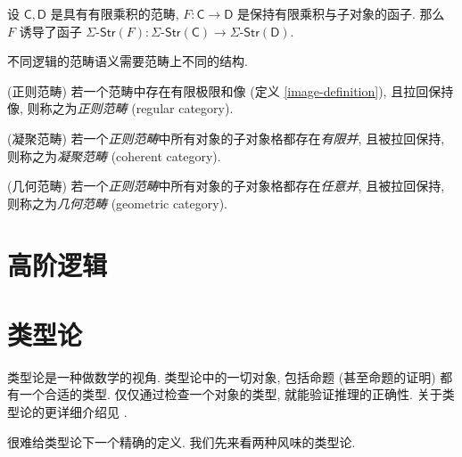 \begin{prop}
	{}
	设 $\mathsf C,\mathsf D$ 是具有有限乘积的范畴,
	$F \colon \mathsf C \to \mathsf D$ 是保持有限乘积与子对象的函子. 那么 $F$ 诱导了函子
	$\Sigma\text{-}\mathsf{Str}(F)\colon \Sigma\text{-}\mathsf{Str}(\mathsf C) \to \Sigma\text{-}\mathsf{Str}(\mathsf D)$.
\end{prop}

不同逻辑的范畴语义需要范畴上不同的结构.

\begin{definition}
	{(正则范畴)}
	若一个范畴中存在有限极限和像 (定义 \ref{image-definition}), 且拉回保持像, 则称之为\emph{正则范畴} (regular category).
\end{definition}

\begin{definition}
	{(凝聚范畴)}
	若一个\emph{正则范畴}中所有对象的子对象格都存在\emph{有限并}, 且被拉回保持, 则称之为\emph{凝聚范畴} (coherent category).
\end{definition}

\begin{definition}
	{(几何范畴)}
	若一个\emph{正则范畴}中所有对象的子对象格都存在\emph{任意并}, 且被拉回保持, 则称之为\emph{几何范畴} (geometric category).
\end{definition}

\section{高阶逻辑}

\todo{}

\section{类型论}

\label{appendix-type-theory}


类型论是一种做数学的视角. 类型论中的一切对象, 包括命题 (甚至命题的证明) 都有一个合适的类型. 仅仅通过检查一个对象的类型, 就能验证推理的正确性. 关于类型论的更详细介绍见 \cite{Trebor-History}.

很难给类型论下一个精确的定义. 我们先来看两种风味的类型论.

